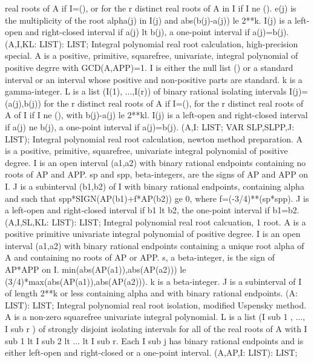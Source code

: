 real roots of A if I=(), or for the r distinct real roots of A in I if
I ne ().  e(j) is the multiplicity of the root alpha(j) in I(j) and
abs(b(j)-a(j))  le 2**k.  I(j) is a left-open and right-closed
interval if a(j) lt b(j), a one-point interval if a(j)=b(j). \ecom 
{} (A,I,KL: LIST): LIST; \eproc
\bcom Integral polynomial real root calculation, high-precision special.
A is a positive, primitive, squarefree, univariate, integral polynomial
of positive degrre with GCD(A,APP)=1.  I is either the null list () or
a standard interval or an interval whose positive and non-positive parts
are standard.  k is a gamma-integer.  L is a list (I(1), ...,I(r)) of
binary rational isolating intervals I(j)=(a(j),b(j)) for the r
distinct real roots of A if I=(), for the r distinct real roots of A
of I if I ne (), with b(j)-a(j) le 2**kl.  I(j) is a left-open and
right-closed interval if a(j) ne b(j), a one-point interval if
a(j)=b(j). \ecom 
{} (A,I: LIST; VAR SLP,SLPP,J: LIST); \eproc
\bcom Integral polynomial real root calculation, newton method preparation.
A is a positive, primitive, squarefree, univariate integral polynomial
of positive degree.  I is an open interval (a1,a2) with binary
rational endpoints containing no roots of AP and APP.  sp and spp,
beta-integers, are the signs of AP and APP on I.  J is a subinterval
(b1,b2) of I with binary rational endpoints, containing alpha and
such that spp*SIGN(AP(b1)+f*AP(b2)) ge 0, where
f=(-3/4)**(sp*spp).  J is a left-open and right-closed interval if
b1 lt b2, the one-point interval if b1=b2. \ecom 
{} (A,I,SL,KL: LIST): LIST; \eproc
\bcom Integral polynomial real root calcuation, 1 root. A is a positive
primitive univariate integral polynomial of positive degree. I is an
open interval (a1,a2) with binary rational endpoints containing a
unique root alpha of A and containing no roots of AP or APP.  s, a
beta-integer, is the sign of AP*APP on I.
min(abs(AP(a1)),abs(AP(a2))) le (3/4)*max(abs(AP(a1)),abs(AP(a2))).
k is a beta-integer.  J is a subinterval of I of length 2**k or less
containing alpha and with binary rational endpoints. \ecom 
{} (A: LIST): LIST; \eproc
\bcom Integral polynomial real root isolation, modified Uspensky method.
A is a non-zero squarefree univariate integral polynomial.  L is
a list (I sub 1 , ..., I sub r ) of strongly disjoint isolating
intervals for all of the real roots of A with I sub 1  lt  I
sub 2  lt   ...  lt  I sub r.  Each I sub j has binary rational
endpoints and is either left-open and right-closed or a one-point
interval. \ecom 
{} (A,AP,I: LIST): LIST; \eproc
